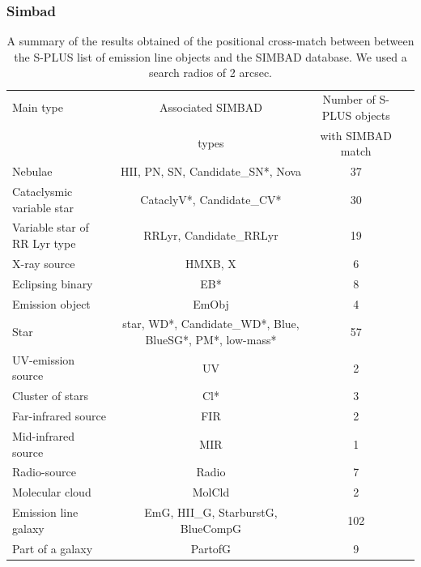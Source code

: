 \documentclass[fleqn,usenatbib]{mnras}
\begin{document}
\subsubsection{Simbad}

\begin{table}
\centering
\caption{A summary of the results obtained of the positional cross-match between
        between the S-PLUS list of emission line objects and the SIMBAD database.
        We used a search radios of 2 arcsec.}
\label{tab:simbad-sources}
\begin{tabular}{lccc} %
  \hline
Main type    & Associated SIMBAD           & Number of S-PLUS objects    \\
             & types                        &  with SIMBAD match         \\
\hline
Nebulae                & HII, PN, SN, Candidate\_SN*, Nova  & 37               \\
Cataclysmic variable star  & CataclyV*, Candidate\_CV* & 30              \\
Variable star of RR Lyr type & RRLyr, Candidate\_RRLyr & 19              \\
X-ray source                & HMXB, X                  & 6               \\
Eclipsing binary            & EB*                    & 8                 \\            
Emission object             & EmObj                  & 4                 \\
Star                        & star, WD*, Candidate\_WD*, Blue, BlueSG*, PM*, low-mass* & 57 \\
UV-emission source          & UV                     & 2                 \\
Cluster of stars            & Cl*                    & 3                 \\
Far-infrared source         & FIR                    & 2                 \\
Mid-infrared source         & MIR                    & 1                 \\
Radio-source                & Radio                  & 7                \\
Molecular cloud             & MolCld                 & 2                 \\
Emission line galaxy        & EmG, HII\_G, StarburstG, BlueCompG & 102   \\
Part of a galaxy            & PartofG                & 9                 \\

\end{tabular}
\end{table}
\end{document}
